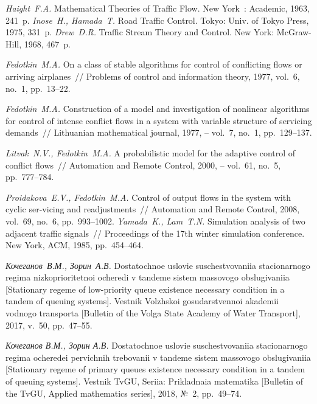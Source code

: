 \documentclass[12pt]{book}
\theoremstyle{plain}
\theoremstyle{remark}
\theoremstyle{plain}
\theoremstyle{definition}
\begin{document}
\begin{Etwocolbib}%

 \textit{Haight~F.A.} Mathematical Theories of Traffic Flow. New York~: Academic, 1963, 241~p. 
 \textit{Inose~H., Hamada~T.} Road Traffic Control. Tokyo: Univ. of Tokyo Press, 1975, 331~p.
 \textit{Drew~D.R.} Traffic Stream Theory and Control. New York: McGraw-Hill, 1968, 467~p.


\textit{Fedotkin~M.A.} On a class of stable algorithms for control of conflicting flows or arriving airplanes~// Problems of control and information theory, 1977, vol.~6, no.~1, pp.~13--22.

\textit{Fedotkin~M.A.} Construction of a model and investigation of nonlinear algorithms for control of intense conflict flows in a system with variable structure of servicing demands~// Lithuanian mathematical journal, 1977, – vol.~7, no.~1, pp.~129--137.

\textit{Litvak~N.V., Fedotkin~M.A.} A probabilistic model for the adaptive control of conflict flows~// Automation and Remote Control, 2000, – vol.~61, no.~5, pp.~777–784.

\textit{Proidakova~E.V., Fedotkin~M.A.} Control of output flows in the system with cyclic ser-vicing and readjustments~// Automation and Remote Control, 2008, vol.~69, no.~6, pp.~993--1002.
\textit{Yamada~K., Lam~T.N.} Simulation analysis of two adjacent traffic signals~// Proceedings of the 17th winter simulation conference. New York, ACM, 1985, pp.~454--464.

\textit{Кочеганов~В.М., Зорин~А.В.} Dostatochnoe uslovie suschestvovaniia stacionarnogo regima nizkoprioritetnoi ocheredi v tandeme sistem massovogo obslugivaniia [Stationary regeme of low-priority queue existence necessary condition in a tandem of queuing systems]. Vestnik Volzhskoi gosudarstvennoi akademii vodnogo transporta [Bulletin of the Volga State Academy of Water Transport], 2017, v.~50, pp.~47--55.

\textit{Кочеганов В.М., Зорин А.В.} Dostatochnoe uslovie suschestvovaniia stacionarnogo regima ocheredei pervichnih trebovanii v tandeme sistem massovogo obslugivaniia [Stationary regeme of primary queues existence necessary condition in a tandem of queuing systems]. Vestnik TvGU, Seriia: Prikladnaia matematika [Bulletin of the TvGU, Applied mathematics series], 2018, №~2, pp.~49--74.
 
\end{Etwocolbib}%

\newpage

 
\end{document}
